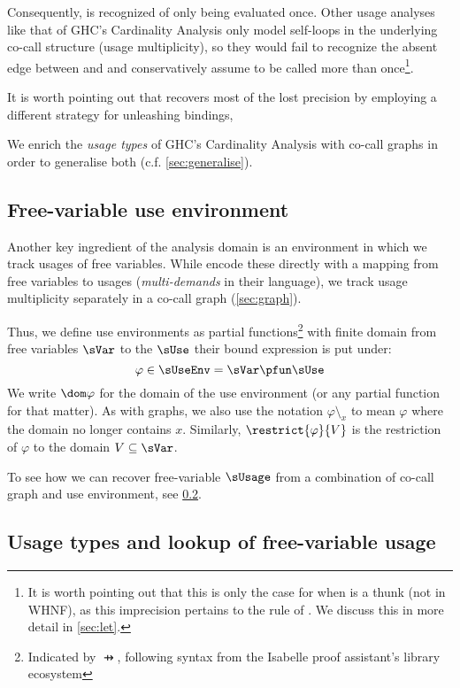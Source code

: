 Consequently,  is recognized of only being evaluated once. 
Other usage analyses like that of GHC's Cardinality Analysis \parencite{card} only model self-loops in the underlying co-call structure (\eg usage multiplicity), so they would fail to recognize the absent edge between  and  and conservatively assume  to be called more than once\footnote{It is worth pointing out that this is only the case for when  is a thunk (\eg not in WHNF), as this imprecision pertains to the  rule of \textcite{card}. We
discuss this in more detail in \cref{sec:let}.}.

It is worth pointing out that \textcite{card} recovers most of the lost precision by employing a different strategy for unleashing  bindings, 

We enrich the \emph{usage types} of GHC's Cardinality Analysis \parencite{card} with co-call graphs in order to generalise both (c.f. \cref{sec:generalise}).

\subsection{Free-variable use environment}\label{sec:useenv}

Another key ingredient of the analysis domain is an environment in which we track usages of free variables.
While \textcite{card} encode these directly with a mapping from free variables to usages (\emph{multi-demands} in their language), we track usage multiplicity separately in a co-call graph (\cref{sec:graph}).

Thus, we define use environments as partial functions\footnote{Indicated by $\pfun$, following syntax from the Isabelle proof assistant's library ecosystem} with finite domain from free variables $\sVar$ to the $\sUse$ their bound expression is put under:
\[
\varphi \in \sUseEnv = \sVar \pfun \sUse
\]
We write $\dom \varphi$ for the domain of the use environment (or any partial function for that matter).
As with graphs, we also use the notation $\varphi \setminus_x$ to mean $\varphi$ where the domain no longer contains $x$.
Similarly, $\restrict{\varphi}{V}$ is the restriction of $\varphi$ to the domain $V \subseteq \sVar$.

To see how we can recover free-variable $\sUsage$ from a combination of co-call graph and use environment, see \cref{sec:utype}.

\subsection{Usage types and lookup of free-variable usage}\label{sec:utype}


